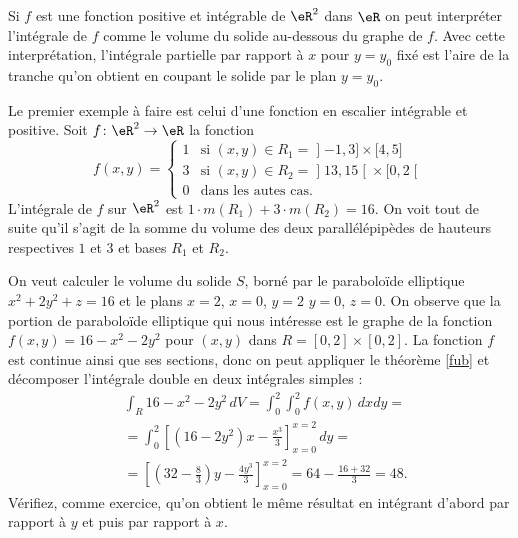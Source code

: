  Si $f$ est une fonction positive et intégrable de $\eR^2$ dans $\eR$ on peut interpréter l'intégrale de $f$ comme le volume du solide au-dessous du graphe de $f$.  Avec cette interprétation,  l'intégrale partielle par rapport à $x$ pour $y=y_0$ fixé est l'aire de la tranche qu'on obtient en coupant le solide par le plan $y=y_0$.
 \begin{example}
   Le premier exemple à faire est celui d'une fonction en escalier intégrable et positive. Soit $f\colon \eR^2\to \eR$ la fonction
\begin{equation}
	f(x,y)=\begin{cases}
		1	&	\text{si $(x,y)\in R_1=\mathopen] -1 , 3 \mathclose]\times\mathopen[ 4 , 5 \mathclose]$}\\
		3	&	 \text{si $(x,y)\in R_2=\mathopen] 13 , 15 \mathclose[\times\mathopen[ 0 , 2 \mathclose[$}\\
		0	&	 \text{dans les autes cas.}
	\end{cases}
\end{equation}
L'intégrale de $f$ sur $\eR^2$ est $1\cdot m(R_1)+ 3\cdot m(R_2)= 16$. On voit tout de suite qu'il s'agit de la somme du volume des deux parallélépipèdes de hauteurs respectives $1$ et $3$ et bases $R_1$ et $R_2$. 
 \end{example}
\begin{example} 
On veut calculer le volume du solide $S$, borné par le paraboloïde elliptique $x^2+2y^2+z=16$ et le plans $x=2$, $x=0$, $y=2$ $y=0$, $z=0$. On observe que la portion de  paraboloïde elliptique qui nous intéresse est le graphe de la fonction $f(x,y)=16-x^2-2y^2$ pour $(x,y)$ dans $R=[0,2]\times[0,2]$. La fonction $f$ est continue ainsi que ses sections, donc on peut appliquer le théorème \ref{fub} et décomposer l'intégrale double en deux intégrales simples :
\begin{equation}
  \begin{aligned}
   & \int_R 16-x^2-2y^2 \,dV= \int_{0}^2\int_{0}^2f(x,y)\,dx dy= \\
&=\int_0^2 \left[(16-2y^2)x-\frac{x^3}{3}\right]_{x=0}^{x=2}\, dy =\\
& = \left[ \left(32-\frac{8}{3}\right) y -\frac{4y^3}{3}\right]_{x=0}^{x=2}= 64- \frac{16+32}{3}=48.
  \end{aligned}
\end{equation}
Vérifiez, comme exercice, qu'on obtient le même résultat en intégrant d'abord par rapport à $y$ et puis par rapport à $x$.  
\end{example}
